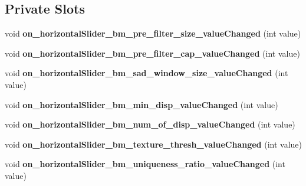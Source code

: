 \subsection*{Private Slots}
\begin{DoxyCompactItemize}
\item 
\hypertarget{classstereo_match_param_form_a6fc9b3b33af491d24d667aaceccc7ac0}{}void {\bfseries on\+\_\+horizontal\+Slider\+\_\+bm\+\_\+pre\+\_\+filter\+\_\+size\+\_\+value\+Changed} (int value)\label{classstereo_match_param_form_a6fc9b3b33af491d24d667aaceccc7ac0}

\item 
\hypertarget{classstereo_match_param_form_ae333fa3bfc8a4e981a77894a5cf2b4d5}{}void {\bfseries on\+\_\+horizontal\+Slider\+\_\+bm\+\_\+pre\+\_\+filter\+\_\+cap\+\_\+value\+Changed} (int value)\label{classstereo_match_param_form_ae333fa3bfc8a4e981a77894a5cf2b4d5}

\item 
\hypertarget{classstereo_match_param_form_a05e103bb3adfab5e19a62dc3d4e27515}{}void {\bfseries on\+\_\+horizontal\+Slider\+\_\+bm\+\_\+sad\+\_\+window\+\_\+size\+\_\+value\+Changed} (int value)\label{classstereo_match_param_form_a05e103bb3adfab5e19a62dc3d4e27515}

\item 
\hypertarget{classstereo_match_param_form_ae572eeb4250fd61845d81329be03a4d7}{}void {\bfseries on\+\_\+horizontal\+Slider\+\_\+bm\+\_\+min\+\_\+disp\+\_\+value\+Changed} (int value)\label{classstereo_match_param_form_ae572eeb4250fd61845d81329be03a4d7}

\item 
\hypertarget{classstereo_match_param_form_a230fee1aee584226d74a54aad9293bb5}{}void {\bfseries on\+\_\+horizontal\+Slider\+\_\+bm\+\_\+num\+\_\+of\+\_\+disp\+\_\+value\+Changed} (int value)\label{classstereo_match_param_form_a230fee1aee584226d74a54aad9293bb5}

\item 
\hypertarget{classstereo_match_param_form_af6290918e0d98424abe2a5469be815d4}{}void {\bfseries on\+\_\+horizontal\+Slider\+\_\+bm\+\_\+texture\+\_\+thresh\+\_\+value\+Changed} (int value)\label{classstereo_match_param_form_af6290918e0d98424abe2a5469be815d4}

\item 
\hypertarget{classstereo_match_param_form_a5039e2ba6b375cbc147032b9450c842e}{}void {\bfseries on\+\_\+horizontal\+Slider\+\_\+bm\+\_\+uniqueness\+\_\+ratio\+\_\+value\+Changed} (int value)\label{classstereo_match_param_form_a5039e2ba6b375cbc147032b9450c842e}


\end{DoxyCompactItemize}

